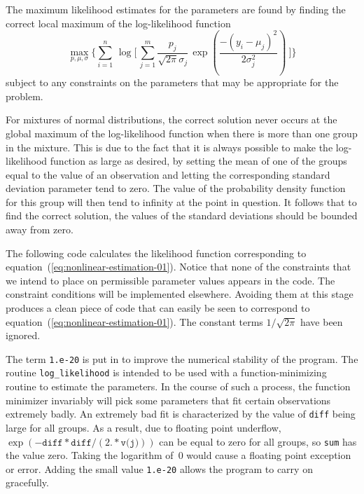 \documentclass{admbmanual}
\begin{document}
The maximum likelihood estimates for the parameters are found by 
finding the correct local maximum of the
log-likelihood function 
\begin{equation}\label{eq:nonlinear-estimation-01} %
  \max_{p,\mu,\sigma}
   \Bigg\{
       \sum_{i=1}^n \,\log
         \Bigg[\,
             \sum_{j=1}^m \frac{p_j}{\sqrt{2\pi}\sigma_j}
               \,\exp
                   \left(
                       \frac{-(y_i-\mu_j)^2}{2\sigma_j^2}
                   \right)\
          \Bigg]
    \Bigg\}
\end{equation}
subject to any constraints on the parameters that may
be appropriate for the problem. 

For mixtures of normal distributions, the correct solution never occurs at 
the global maximum of the log-likelihood function when there is more
than one group in the mixture. This is due to the fact that it is
always possible to make the log-likelihood function
as large as desired, by setting the mean of one of the groups equal to
the value of an observation and letting the corresponding standard
deviation parameter tend to zero. The value of the
probability density function for this group will then tend to infinity
at the point in question. It follows that to find the
correct solution, the values of the standard deviations should be 
bounded away from zero.

The following code calculates the likelihood function
corresponding to equation~(\ref{eq:nonlinear-estimation-01}). Notice that 
none of the constraints that we intend to place on permissible
parameter values appears in the code. The constraint conditions
will be implemented elsewhere. Avoiding them at this stage produces
a clean piece of code that can easily be seen to
correspond to equation~(\ref{eq:nonlinear-estimation-01}). The constant terms
$1/\sqrt{2\pi}$ have been ignored. 


The term \texttt{1.e-20} is put in to improve the numerical stability
of the program. The routine \texttt{log\_likelihood} is intended to
be used with a function-minimizing routine to estimate the parameters. 
In the course of such a process, the function minimizer invariably
will pick some parameters that fit certain observations extremely 
badly. An extremely bad fit is characterized by the value of
\texttt{diff} being large for all groups. As a result, due to
floating point underflow, $\exp(-\texttt{diff}*\texttt{diff}/(2.*\texttt{v(j)}))$ 
can be equal to zero for all
groups, so \texttt{sum} has the value zero. Taking the logarithm
of~$0$ would cause a floating point exception or error. Adding
the small value \texttt{1.e-20} allows the program to carry on 
gracefully. 
\end{document}
